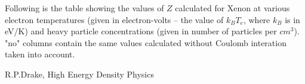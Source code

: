 \documentclass[english,12pt]{revtex4}
\begin{document}
Following is the table showing the values of $Z$ calculated for Xenon
at various electron temperatures
(given in electron-volts -- the value of $k_{B}T_{e}$, where $k_{B}$
is in eV/K) and heavy particle concentrations (given in number of
particles per $cm^{3}$). "no" columns contain the same values
calculated without Coulomb interation taken into account.

\begin{center}

\par\end{center}


%
%





\begin{thebibliography}{99}
R.P.Drake, High Energy Density Physics
\end{thebibliography}
\end{document}
